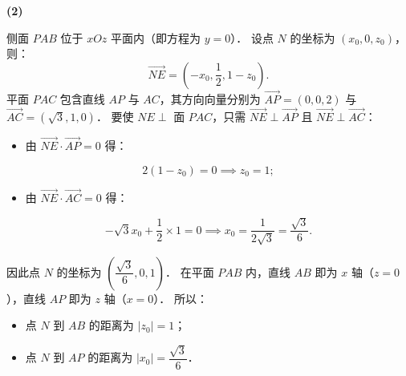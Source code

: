 \begin{answer}
\textbf{(2)}

侧面 $PAB$ 位于 $xOz$ 平面内（即方程为 $y = 0$）．
设点 $N$ 的坐标为 $(x_0, 0, z_0)$，则：
\nopagebreak[4]
\[
\vec{NE} = \left(-x_0, \frac{1}{2}, 1 - z_0\right).
\]
平面 $PAC$ 包含直线 $AP$ 与 $AC$，其方向向量分别为 $\vec{AP} = (0, 0, 2)$ 与 $\vec{AC} = (\sqrt{3}, 1, 0)$．
要使 $NE \perp$ 面 $PAC$，只需 $\vec{NE} \perp \vec{AP}$ 且 $\vec{NE} \perp \vec{AC}$：
\begin{itemize}
\item 由 $\vec{NE} \cdot \vec{AP} = 0$ 得：
\end{itemize}
\nopagebreak[4]
\[
2(1 - z_0) = 0 \implies z_0 = 1;
\]
\begin{itemize}
\item 由 $\vec{NE} \cdot \vec{AC} = 0$ 得：
\end{itemize}
\nopagebreak[4]
\[
-\sqrt{3}x_0 + \frac{1}{2} \times 1 = 0 \implies x_0 = \frac{1}{2\sqrt{3}} = \frac{\sqrt{3}}{6}.
\]

因此点 $N$ 的坐标为 $\left(\dfrac{\sqrt{3}}{6}, 0, 1\right)$．
在平面 $PAB$ 内，直线 $AB$ 即为 $x$ 轴（$z = 0$），直线 $AP$ 即为 $z$ 轴（$x = 0$）．
所以：
\begin{itemize}
\item 点 $N$ 到 $AB$ 的距离为 $|z_0| = 1$；
\item 点 $N$ 到 $AP$ 的距离为 $|x_0| = \dfrac{\sqrt{3}}{6}$．
\end{itemize}



\end{answer}
